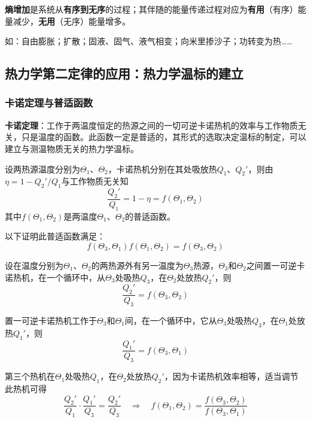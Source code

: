 \documentclass[UTF8]{ctexart}
\theoremstyle{definition}
\begin{document}
\textbf{熵增加}是系统从\textbf{有序到无序}的过程；其伴随的能量传递过程对应为\textbf{有用}（有序）能量减少，\textbf{无用}（无序）能量增多。

如：自由膨胀；扩散；固液、固气、液气相变；向米里掺沙子；功转变为热……

\subsection{热力学第二定律的应用：热力学温标的建立}

\subsubsection*{卡诺定理与普适函数}

\textbf{卡诺定理}：工作于两温度恒定的热源之间的一切可逆卡诺热机的效率与工作物质无关，只是温度的函数。此函数一定是普适的，其形式的选取决定温标的制定，可以建立与测温物质无关的热力学温标。

设两热源温度分别为$\Theta_1$、$\Theta_2$，卡诺热机分别在其处吸放热$Q_1$、$Q_2'$，则由$\eta = 1 - Q_2'/Q_1$与工作物质无关知
\begin{equation}
\frac{Q_2'}{Q_1} = 1-\eta = f(\Theta_1,\Theta_2)
\end{equation}
其中$f(\Theta_1,\Theta_2)$是两温度$\Theta_1$、$\Theta_2$的普适函数。

以下证明此普适函数满足：
\begin{equation}
f(\Theta_3,\Theta_1)f(\Theta_1,\Theta_2) = f(\Theta_3,\Theta_2)
\end{equation}

设在温度分别为$\Theta_1$、$\Theta_2$的两热源外有另一温度为$\Theta_3$热源，$\Theta_3$和$\Theta_2$之间置一可逆卡诺热机，在一个循环中，从$\Theta_3$处吸热$Q_3$，在$\Theta_2$处放热$Q_2'$，则
\begin{equation}
\frac{Q_2'}{Q_3} = f(\Theta_3,\Theta_2)
\end{equation}

置一可逆卡诺热机工作于$\Theta_3$和$\Theta_1$间，在一个循环中，它从$\Theta_3$处吸热$Q_3$，在$\Theta_1$处放热$Q_1'$，则
\begin{equation}
\frac{Q_1'}{Q_3} = f(\Theta_3,\Theta_1)
\end{equation}

第三个热机在$\Theta_1$处吸热$Q_1$，在$\Theta_2$处放热$Q_2'$，因为卡诺热机效率相等，适当调节此热机可得
\begin{equation}
\frac{Q_2'}{Q_1}\cdot\frac{Q_1'}{Q_3} = \frac{Q_2'}{Q_3}
\quad\Rightarrow\quad
f(\Theta_1,\Theta_2) = \frac{f(\Theta_3,\Theta_2)}{f(\Theta_3,\Theta_1)}
\end{equation}
\end{document}

